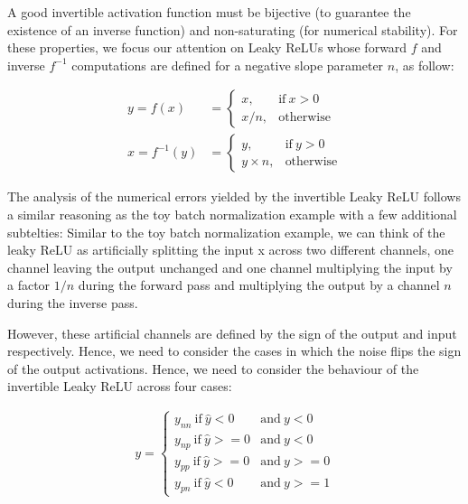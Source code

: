 \documentclass[twocolumn]{bmcart}
\begin{document}
A good invertible activation function must be bijective (to guarantee the existence of an inverse function) and non-saturating (for numerical stability).
For these properties, we focus our attention on Leaky ReLUs whose forward $f$ and inverse $f^{-1}$ computations are defined for a negative slope parameter $n$, as follow:

\begin{subequations}
	\begin{align}
	y = f(x) &=      \begin{cases}
	x, & \text{if}\ x>0 \\
	x / n, & \text{otherwise}
	\end{cases} \\
	x = f^{-1}(y) &= \begin{cases}
	     y, & \text{if}\ y>0 \\
	     y \times n, & \text{otherwise}
	\end{cases} 
	\end{align}
\end{subequations}

The analysis of the numerical errors yielded by the invertible Leaky ReLU follows a similar reasoning as the toy batch normalization example with a few additional subtelties:
Similar to the toy batch normalization example, we can think of the leaky ReLU as artificially splitting the input x across two different channels, one channel leaving the output unchanged and one channel multiplying the input by a factor $1/n$ during the forward pass and multiplying the output by a channel $n$ during the inverse pass.

However, these artificial channels are defined by the sign of the output and input respectively.
Hence, we need to consider the cases in which the noise flips the sign of the output activations. Hence, we need to consider the behaviour of the invertible Leaky ReLU across four cases: 

\begin{subequations}
\begin{align}
y = \begin{cases}
y_{nn} \  \text{if}\  \hat{y}<0  &\text{and}\  y<0     \\
y_{np} \ \text{if}\  \hat{y}>=0  &\text{and}\  y<0    \\
y_{pp} \  \text{if}\  \hat{y}>=0  &\text{and}\  y>=0 \\
y_{pn} \ \text{if}\  \hat{y}<0     &\text{and}\  y>=1 
\end{cases} 
\end{align}
\end{subequations}
\end{document}
